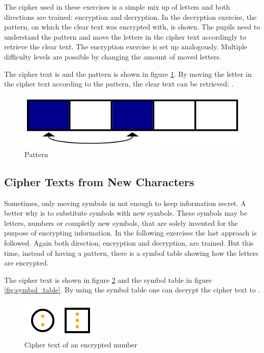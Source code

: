 The cipher used in these exercises is a simple mix up of letters and both directions are trained: encryption and decryption. In the decryption exercise, the pattern, on which the clear text was encrypted with, is shown. The pupils need to understand the pattern and move the letters in the cipher text accordingly to retrieve the clear text. The encryption exercise is set up analogously. Multiple difficulty levels are possible by changing the amount of moved letters.

\begin{example}
    The cipher text is  and the pattern is shown in figure \ref{fig:pattern}. By moving the letter in the cipher text according to the pattern, the clear text can be retrieved: .
\end{example}

\begin{figure} 
    \centering
    \includegraphics[width=0.4 \columnwidth]{figures/pattern.png}
    \caption{Pattern} 
    \label{fig:pattern} 
\end{figure}

\subsection{Cipher Texts from New Characters}

Sometimes, only moving symbols in not enough to keep information secret. A better why is to substitute symbols with new symbols. These symbols may be letters, numbers or completly new symbols, that are solely invented for the purpose of encrypting information.
In the following exercises the last approach is followed. Again both direction, encryption and decryption, are trained. But this time, instead of having a pattern, there is a symbol table showing how the letters are encrypted. 

\begin{example}
    The cipher text is shown in figure \ref{fig:cipher_number} and the symbol table in figure \ref{fig:symbol_table}. By using the symbol table one can decrypt the cipher text to .
\end{example}

\begin{figure} 
    \centering
    \includegraphics[width=0.2 \columnwidth]{figures/cipher_number.png}
    \caption{Cipher text of an encrypted number} 
    \label{fig:cipher_number} 
\end{figure}

